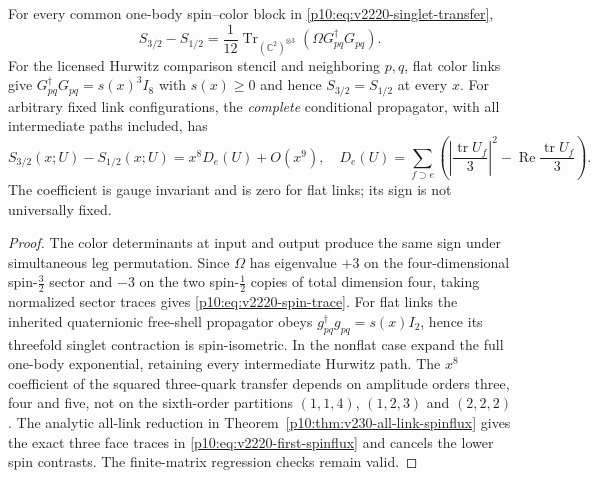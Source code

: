 \documentclass[12pt,a4paper]{article}
\begin{document}
\begin{theorem}
\label{p10:thm:v2220-conditional-spinflux}
For every common one-body spin--color block in
\eqref{p10:eq:v2220-singlet-transfer},
\begin{equation}
\label{p10:eq:v2220-spin-trace}
 S_{3/2}-S_{1/2}
 =\frac1{12}\operatorname{Tr}_{(\mathbb C^2)^{\otimes3}}
    (\Omega G_{pq}^{\dagger}G_{pq}).
\end{equation}
For the licensed Hurwitz comparison stencil and neighboring $p,q$,
flat color links give $G_{pq}^{\dagger}G_{pq}=s(x)^3I_8$ with
$s(x)\ge0$ and hence $S_{3/2}=S_{1/2}$ at every $x$.  For arbitrary
fixed link configurations, the \emph{complete} conditional propagator,
with all intermediate paths included, has
\begin{equation}
\label{p10:eq:v2220-first-spinflux}
 S_{3/2}(x;U)-S_{1/2}(x;U)
 =x^8D_e(U)+O(x^9),\quad
 D_e(U)=\sum_{f\supset e}
 \left(\left|\frac{\operatorname{tr}U_f}{3}\right|^2
       -\operatorname{Re}\frac{\operatorname{tr}U_f}{3}\right).
\end{equation}
The coefficient is gauge invariant and is zero for flat links; its sign
is not universally fixed.
\end{theorem}
\begin{proof}
The color determinants at input and output produce the same sign under
simultaneous leg permutation.  Since $\Omega$ has eigenvalue $+3$ on
the four-dimensional spin-$\tfrac32$ sector and $-3$ on the two
spin-$\tfrac12$ copies of total dimension four, taking normalized
sector traces gives \eqref{p10:eq:v2220-spin-trace}.
For flat links the inherited quaternionic free-shell propagator obeys
$g_{pq}^{\dagger}g_{pq}=s(x)I_2$, hence its threefold singlet
contraction is spin-isometric.  In the nonflat case expand the full one-body exponential,
retaining every intermediate Hurwitz path.  The $x^8$ coefficient of the
squared three-quark transfer depends on amplitude orders three, four and
five, not on the sixth-order partitions $(1,1,4)$, $(1,2,3)$ and
$(2,2,2)$.  The analytic all-link reduction in
Theorem~\ref{p10:thm:v230-all-link-spinflux} gives the exact three
face traces in \eqref{p10:eq:v2220-first-spinflux} and cancels the
lower spin contrasts.  The finite-matrix regression checks remain valid.
\end{proof}
\end{document}
